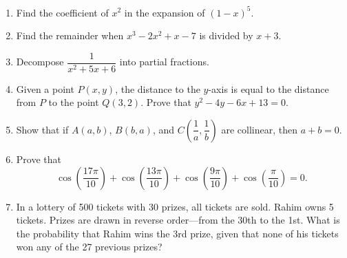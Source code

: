 \documentclass[12pt]{article}
\begin{document}
\begin{enumerate}
    \item Find the coefficient of \( x^2 \) in the expansion of \( (1 - x)^5 \).
    \item Find the remainder when \( x^3 - 2x^2 + x - 7 \) is divided by \( x + 3 \).
    \item Decompose \( \dfrac{1}{x^2 + 5x + 6} \) into partial fractions.
    \item Given a point \( P(x, y) \), the distance to the \( y \)-axis is equal to the distance from \( P \) to the point \( Q(3, 2) \). Prove that \( y^2 - 4y - 6x + 13 = 0 \).
    \item Show that if \( A(a, b) \), \( B(b, a) \), and \( C\left(\dfrac{1}{a}, \dfrac{1}{b}\right) \) are collinear, then \( a + b = 0 \).
    \item Prove that
    \[
        \cos\left(\dfrac{17\pi}{10}\right) + \cos\left(\dfrac{13\pi}{10}\right) + \cos\left(\dfrac{9\pi}{10}\right) + \cos\left(\dfrac{\pi}{10}\right) = 0.
    \]
    \item In a lottery of 500 tickets with 30 prizes, all tickets are sold. Rahim owns 5 tickets. Prizes are drawn in reverse order—from the 30th to the 1st. What is the probability that Rahim wins the 3rd prize, given that none of his tickets won any of the 27 previous prizes?
\end{enumerate}
\end{document}
